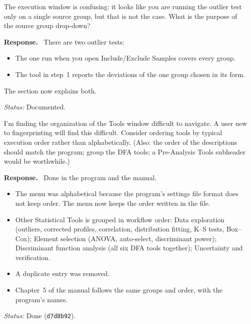 \documentclass[11pt]{article}
\newcommand{\commit}[1]{\texttt{#1}}
\newcounter{cmt}
\newcounter{grp}
\renewcommand{\thecmt}{\thegrp.\arabic{cmt}}
\newenvironment{reviewer}[1]{%
  \refstepcounter{cmt}%
  \begin{tcolorbox}[enhanced,breakable,colback=commentbg,colframe=usgsgreen!60,
    boxrule=0.4pt,left=6pt,right=6pt,top=4pt,bottom=4pt,
    title={\small\textbf{Comment \thecmt}\hfill\textit{#1}},
    coltitle=black,colbacktitle=usgsgreen!15,fonttitle=\small]}%
  {\end{tcolorbox}}
\newenvironment{response}{\par\noindent\textbf{Response.}\ }{\par\medskip}
\newcommand{\status}[1]{\par\noindent\textit{Status:} #1\par}
\begin{document}
\begin{reviewer}{Outlier analysis}
The execution window is confusing: it looks like you are running the outlier
test only on a single source group, but that is not the case. What is the
purpose of the source group drop-down?
\end{reviewer}
\begin{response}
There are two outlier tests:
\begin{itemize}
    \item The one run when you open Include/Exclude Samples covers every group.
    \item The tool in step~1 reports the deviations of the one group chosen in
          its form.
\end{itemize}
The section now explains both.
\end{response}
\status{Documented.}

\begin{reviewer}{Tools}
I'm finding the organization of the Tools window difficult to navigate. A user
new to fingerprinting will find this difficult. Consider ordering tools by
typical execution order rather than alphabetically. (Also: the order of the
descriptions should match the program; group the DFA tools; a Pre-Analysis
Tools subheader would be worthwhile.)
\end{reviewer}
\begin{response}
Done in the program and the manual.
\begin{itemize}
    \item The menu was alphabetical because the program's settings file format
          does not keep order. The menu now keeps the order written in the
          file.
    \item Other Statistical Tools is grouped in workflow order: Data
          exploration (outliers, corrected profiles, correlation, distribution
          fitting, K--S tests, Box--Cox); Element selection (ANOVA, auto-select,
          discriminant power); Discriminant function analysis (all six DFA
          tools together); Uncertainty and verification.
    \item A duplicate entry was removed.
    \item Chapter~5 of the manual follows the same groups and order, with the
          program's names.
\end{itemize}
\end{response}
\status{Done (\commit{d7d8b92}).}
\end{document}
